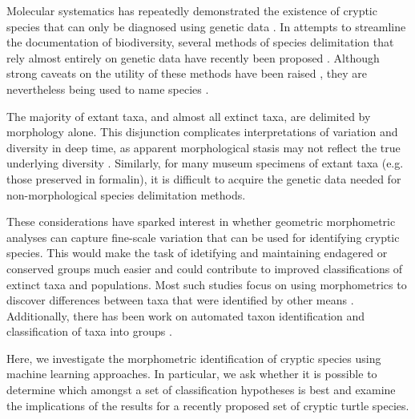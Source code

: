 \documentclass[12pt,letterpaper]{article}
\begin{document}
Molecular systematics has repeatedly demonstrated the existence of cryptic species that can only be diagnosed using genetic data \citep{Stuart2006,Bickford2007,SchlickSteiner2007,Pfenninger2007,Clare2011,Funk2012}. In attempts to streamline the documentation of biodiversity, several methods of species delimitation that rely almost entirely on genetic data have recently been proposed \citep{Pons2006,Carstens2010,Hausdorf2010,O'Meara2010,Yang2010b,Huelsenbeck2011b}. Although strong caveats on the utility of these methods have been raised \citep{Bauer2000,Carstens2013}, they are nevertheless being used to name species \citep{Leache2010,Spinks2014}.

The majority of extant taxa, and almost all extinct taxa, are delimited by morphology alone. This disjunction complicates interpretations of variation and diversity in deep time, as apparent morphological stasis may not reflect the true underlying diversity \citep{Eldredge1972,Gould1977a,Hunt2008,VanBocxlaer2013}. Similarly, for many museum specimens of extant taxa (e.g. those preserved in formalin), it is difficult to acquire the genetic data needed for non-morphological species delimitation methods.

These considerations have sparked interest in whether geometric morphometric analyses can capture fine-scale variation that can be used for identifying cryptic species. This would make the task of idetifying and maintaining endagered or conserved groups much easier and could contribute to improved classifications of extinct taxa and populations. Most such studies focus on using morphometrics to discover differences between taxa that were identified by other means \citep{Polly2003,Zelditch2004,Gaubert2005b,Gunduz2007,Polly2007a,Demandt2009}. Additionally, there has been work on automated taxon identification and classification of taxa into groups \citep{Baylac2003,Dobigny2003,MacLeod2007,VandenBrink2011}. 

Here, we investigate the morphometric identification of cryptic species using machine learning approaches. In particular, we ask whether it is possible to determine which amongst a set of classification hypotheses is best and examine the implications of the results for a recently proposed set of cryptic turtle species.

\end{document}
